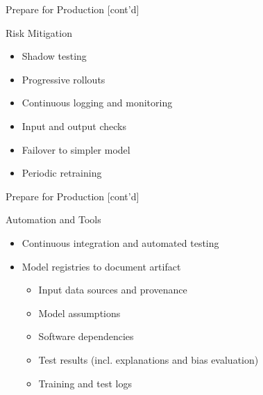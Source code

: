 \documentclass[ignorenonframetext,xcolor=x11names]{beamer}
\begin{document}
\begin{frame}[label=full]{Prepare for Production \small [cont'd]}
\begin{block}{Risk Mitigation}
\begin{itemize}
   \item Shadow testing
   \item Progressive rollouts
   \item Continuous logging and monitoring
   \item Input and output checks
   \item Failover to simpler model
   \item Periodic retraining
\end{itemize}
\end{block}
\end{frame}

\begin{frame}[label=full]{Prepare for Production \small [cont'd]}
\begin{block}{Automation and Tools}
\begin{itemize}
   \item Continuous integration and automated testing
   \item Model registries to document artifact
   \begin{itemize}
      \item Input data sources and provenance
      \item Model assumptions
      \item Software dependencies
      \item Test results (incl. explanations and bias evaluation)
      \item Training and test logs
   \end{itemize}
\end{itemize}
\end{block}
\end{frame}   
\end{document}
